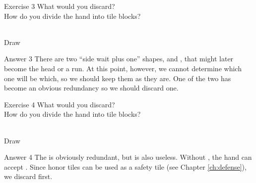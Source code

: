 \vfill

\begin{itembox}[l]{Exercise 3}
What would you discard? \\
\vsp
How do you divide the hand into tile blocks? 

\bp
{}~\\
\hfill\footnotesize{Draw~~~~~~~~~~~}
\ep
\end{itembox}


\newpage

\begin{itembox}[r]{Answer 3}
\emj
There are two ``side wait plus one'' shapes, {\LARGE{}} and {\LARGE{}}, that might later become the head or a run. At this point, however, we cannot determine which one will be which, so we should keep them as they are. 
One of the two {\LARGE{}} has become an obvious redundancy so we should discard one. 
\end{itembox}

\vfill

\begin{itembox}[l]{Exercise 4}
What would you discard? \\
\vsp
How do you divide the hand into tile blocks? 

\bp
{}\bei~\\
\hfill\footnotesize{Draw~~~~~~~~~~~}
\ep
\end{itembox}


\newpage

\begin{itembox}[r]{Answer 4}
\emj
The {\LARGE\bei} is obviously redundant, but {\LARGE{}} is also useless. Without {\LARGE{}}, the hand can accept {\LARGE{}}. Since honor tiles can be used as a safety tile (see Chapter \ref{ch:defense}), we discard {\LARGE{}} first. 
\end{itembox}


